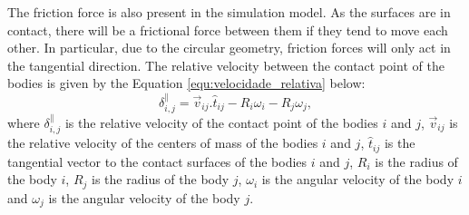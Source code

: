     The friction force is also present in the simulation model. As the surfaces are in contact, there will be a frictional force between them if they tend to move each other. In particular, due to the circular geometry, friction forces will only act in the tangential direction. The relative velocity between the contact point of the bodies is given by the Equation \ref{equ:velocidade_relativa} below: 
\begin{equation}
    \label{equ:velocidade_relativa}
    \delta_{i,j}^{\parallel} = \vec{v}_{ij}.\hat{t}_{ij} - R_{i}\omega_{i} - R_{j}\omega_{j},
\end{equation}
where $\delta_{i,j}^{\parallel}$ is the relative velocity of the contact point of the bodies $i$ and $j$, $\vec{v}_{ij}$ is the relative velocity of the centers of mass of the bodies $i$ and $j$, $\hat{t}_{ij}$ is the tangential vector to the contact surfaces of the bodies $i$ and $j$, $R_{i}$ is the radius of the body $i$, $R_{j}$ is the radius of the body $j$, $\omega_{i}$ is the angular velocity of the body $i$ and $\omega_{j}$ is the angular velocity of the body $j$.

